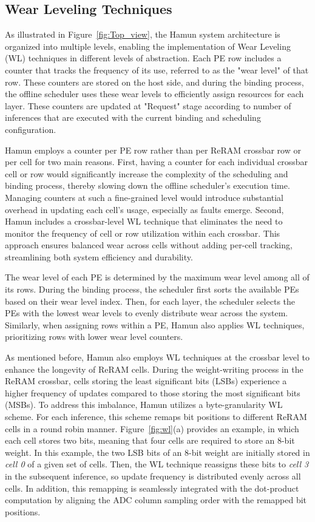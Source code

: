 \subsection{Wear Leveling Techniques}\label{subs:WL}
As illustrated in Figure~\ref{fig:Top_view}, the Hamun system architecture is organized into multiple levels, enabling the implementation of Wear Leveling (WL) techniques in different levels of abstraction. Each PE row includes a counter that tracks the frequency of its use, referred to as the "wear level" of that row. These counters are stored on the host side, and during the binding process, the offline scheduler uses these wear levels to efficiently assign resources for each layer. These counters are updated at "Request" stage according to number of inferences that are executed with the current binding and scheduling configuration.

Hamun employs a counter per PE row rather than per ReRAM crossbar row or per cell for two main reasons. First, having a counter for each individual crossbar cell or row would significantly increase the complexity of the scheduling and binding process, thereby slowing down the offline scheduler's execution time. Managing counters at such a fine-grained level would introduce substantial overhead in updating each cell's usage, especially as faults emerge. Second, Hamun includes a crossbar-level WL technique that eliminates the need to monitor the frequency of cell or row utilization within each crossbar. This approach ensures balanced wear across cells without adding per-cell tracking, streamlining both system efficiency and durability.

The wear level of each PE is determined by the maximum wear level among all of its rows. During the binding process, the scheduler first sorts the available PEs based on their wear level index. Then, for each layer, the scheduler selects the PEs with the lowest wear levels to evenly distribute wear across the system. Similarly, when assigning rows within a PE, Hamun also applies WL techniques, prioritizing rows with lower wear level counters.

As mentioned before, Hamun also employs WL techniques at the crossbar level to enhance the longevity of ReRAM cells. During the weight-writing process in the ReRAM crossbar, cells storing the least significant bits (LSBs) experience a higher frequency of updates compared to those storing the most significant bits (MSBs). To address this imbalance, Hamun utilizes a byte-granularity WL scheme. For each inference, this scheme remaps bit positions to different ReRAM cells in a round robin manner. Figure~\ref{fig:wl}(a) provides an example, in which each cell stores two bits, meaning that four cells are required to store an 8-bit weight. In this example, the two LSB bits of an 8-bit weight are initially stored in \textit{cell 0} of a given set of cells. Then, the WL technique reassigns these bits to \textit{cell 3} in the subsequent inference, so update frequency is distributed evenly across all cells. In addition, this remapping is seamlessly integrated with the dot-product computation by aligning the ADC column sampling order with the remapped bit positions.

